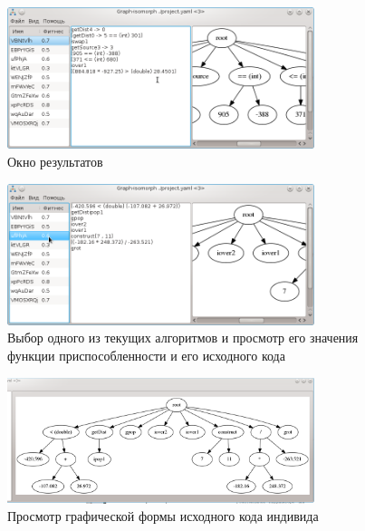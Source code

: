 \documentclass[russian,utf8,emptystyle]{eskdtext}
\begin{document}
\begin{figure}[h!]
\centering
\includegraphics[width=0.8\textwidth]{screen19}
\caption{Окно результатов}
\label{fig:resultsWnd}
\end{figure}

\begin{figure}[h!]
\centering
\includegraphics[width=0.8\textwidth]{screen20}
\caption{Выбор одного из текущих алгоритмов и просмотр его значения функции приспособленности и его исходного кода}
\label{fig:resultsWndSelectInd}
\end{figure}

\begin{figure}[h!]
\centering
\includegraphics[width=0.8\textwidth]{screen21}
\caption{Просмотр графической формы исходного кода индивида}
\label{fig:resultsWndGraphInd}
\end{figure}
\end{document}

